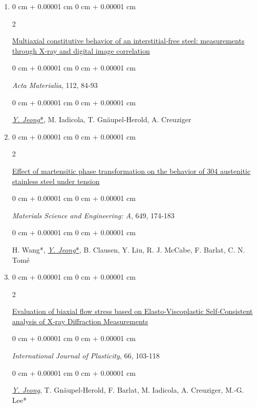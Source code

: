 \documentclass[10pt, letterpaper]{article}
\newenvironment{onecolentry}{
    \begin{adjustwidth}{
        0 cm + 0.00001 cm
    }{
        0 cm + 0.00001 cm
    }
}{
    \end{adjustwidth}
} %
\newenvironment{twocolentry}[2][]{
    \onecolentry
    \def\secondColumn{#2}
    \setcolumnwidth{\fill, 4.5 cm}
    \begin{paracol}{2}
}{
    \switchcolumn \raggedleft \secondColumn
    \end{paracol}
    \endonecolentry
} %
\begin{document}
\begin{enumerate}
        \item
        \begin{twocolentry}{2016}
            \href{http://dx.doi.org/10.1016/j.actamat.2016.04.013}{Multiaxial constitutive behavior of an interstitial‑free steel: measurements through X‑ray and digital image correlation }
        \end{twocolentry}
        \begin{onecolentry}
            {\it Acta Materialia}, 112, 84‑93
        \end{onecolentry}
        \begin{onecolentry}
            {\underline{\textit{Y. Jeong}*}},  M. Iadicola, T. Gnäupel‑Herold, A. Creuziger
        \end{onecolentry}
        \vspace{0.10 cm}


        \item
        \begin{twocolentry}{2016}
            \href{http://dx.doi.org/10.1016/j.msea.2015.09.108}{Effect of martensitic phase transformation on the behavior of 304 austenitic stainless steel under tension}
        \end{twocolentry}
        \begin{onecolentry}
            {\it Materials Science and Engineering: A}, 649, 174‑183
        \end{onecolentry}
        \begin{onecolentry}
            H. Wang*, {\underline{\textit{Y. Jeong}*}}, B. Clausen, Y. Liu, R. J. McCabe, F. Barlat, C. N. Tomé
        \end{onecolentry}
        \vspace{0.10 cm}



        \item
        \begin{twocolentry}{2015}
            \href{http://dx.doi.org/10.1016/j.ijplas.2014.06.009}{Evaluation of biaxial flow stress based on Elasto‑Viscoplastic Self‑Consistent analysis of X‑ray Diffraction Measurements}
        \end{twocolentry}
        \begin{onecolentry}
           {\it International Journal of Plasticity}, 66, 103‑118
        \end{onecolentry}
        \begin{onecolentry}
            {\underline{\textit{Y. Jeong}}}, T. Gnäupel‑Herold, F. Barlat, M. Iadicola, A. Creuziger, M.‑G. Lee*
        \end{onecolentry}
        \vspace{0.10 cm}


\end{enumerate}
\end{document}
